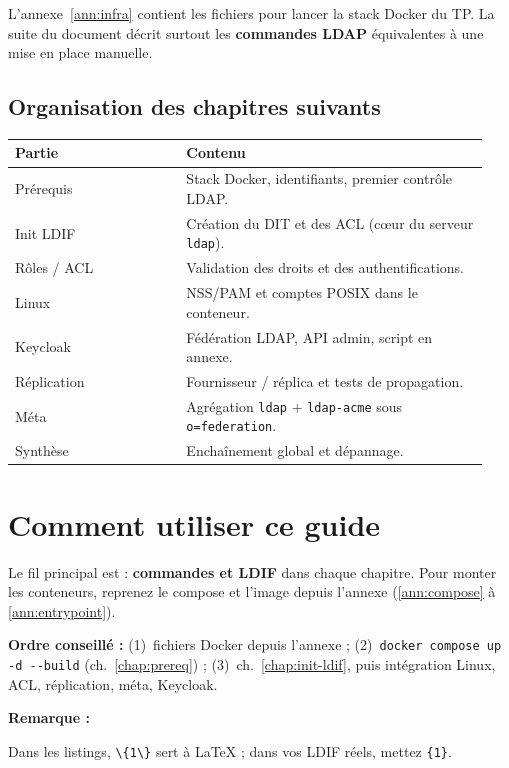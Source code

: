 \documentclass[11pt,a4paper]{report}
\newcommand{\bash}[1]{\lstinline[style=bashstyle, basicstyle=\ttfamily]{#1}}
\newenvironment{nota}{%
  \par\medskip\noindent
  \begin{lrbox}{\notabox}%
  \begin{minipage}{0.97\linewidth}%
  \small
  \textbf{Remarque :}~%
}{%
  \end{minipage}%
  \end{lrbox}%
  {\setlength{\fboxsep}{6pt}%
   \fcolorbox{black!15}{black!3}{\usebox{\notabox}}}%
  \par\medskip
}
\begin{document}
L'annexe~\ref{ann:infra} contient les fichiers pour lancer la stack Docker du TP. La suite du document décrit surtout les \textbf{commandes LDAP} équivalentes à une mise en place manuelle.

\section{Organisation des chapitres suivants}

\begin{tabular}{@{}p{0.34\linewidth}p{0.60\linewidth}@{}}
\toprule
\textbf{Partie} & \textbf{Contenu} \\
\midrule
Prérequis & Stack Docker, identifiants, premier contrôle LDAP. \\
Init LDIF & Création du DIT et des ACL (cœur du serveur \texttt{ldap}). \\
Rôles / ACL & Validation des droits et des authentifications. \\
Linux & NSS/PAM et comptes POSIX dans le conteneur. \\
Keycloak & Fédération LDAP, API admin, script en annexe. \\
Réplication & Fournisseur / réplica et tests de propagation. \\
Méta & Agrégation \texttt{ldap} + \texttt{ldap-acme} sous \texttt{o=federation}. \\
Synthèse & Enchaînement global et dépannage. \\
\bottomrule
\end{tabular}

\chapter{Comment utiliser ce guide}\label{chap:guide-autonome}

Le fil principal est : \textbf{commandes et LDIF} dans chaque chapitre. Pour monter les conteneurs, reprenez le compose et l'image depuis l'annexe (\ref{ann:compose} à \ref{ann:entrypoint}).

\textbf{Ordre conseillé :} (1)~fichiers Docker depuis l'annexe ; (2)~\bash{docker compose up -d --build} (ch.~\ref{chap:prereq}) ; (3)~ch.~\ref{chap:init-ldif}, puis intégration Linux, ACL, réplication, méta, Keycloak.

\begin{nota}
Dans les listings, \texttt{\textbackslash\{1\textbackslash\}} sert à \LaTeX{} ; dans vos LDIF réels, mettez \texttt{\{1\}}.
\end{nota}
\end{document}
